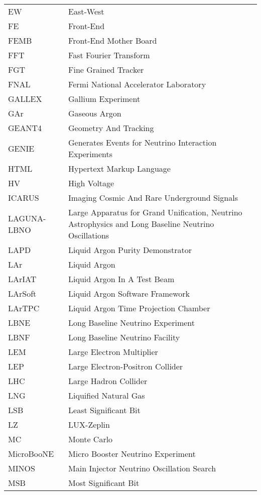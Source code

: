 \begin{longtable}{l p{11cm}}
EW          & East-West \\
FE          & Front-End \\
FEMB        & Front-End Mother Board \\
FFT         & Fast Fourier Transform \\
FGT         & Fine Grained Tracker \\
FNAL        & Fermi National Accelerator Laboratory \\
GALLEX      & Gallium Experiment \\
GAr         & Gaseous Argon \\
GEANT4      & Geometry And Tracking \\
GENIE       & Generates Events for Neutrino Interaction Experiments \\
HTML        & Hypertext Markup Language \\
HV          & High Voltage \\
ICARUS      & Imaging Cosmic And Rare Underground Signals \\
LAGUNA-LBNO & Large Apparatus for Grand Unification, Neutrino Astrophysics and Long Baseline Neutrino Oscillations \\
LAPD        & Liquid Argon Purity Demonstrator \\
LAr         & Liquid Argon \\
LArIAT      & Liquid Argon In A Test Beam \\
LArSoft     & Liquid Argon Software Framework \\
LArTPC      & Liquid Argon Time Projection Chamber \\
LBNE        & Long Baseline Neutrino Experiment \\
LBNF        & Long Baseline Neutrino Facility \\
LEM         & Large Electron Multiplier\\
LEP         & Large Electron-Positron Collider\\
LHC         & Large Hadron Collider \\
LNG         & Liquified Natural Gas \\
LSB         & Least Significant Bit \\
LZ          & LUX-Zeplin \\
MC          & Monte Carlo \\
MicroBooNE  & Micro Booster Neutrino Experiment \\
MINOS       & Main Injector Neutrino Oscillation Search \\
MSB         & Most Significant Bit \\

\end{longtable}

